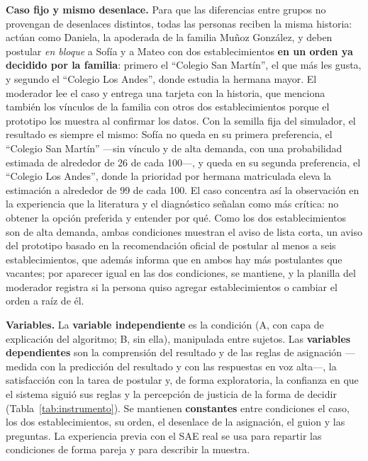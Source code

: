\textbf{Caso fijo y mismo desenlace.} Para que las diferencias entre grupos no provengan de desenlaces distintos, todas las personas reciben la misma historia: actúan como Daniela, la apoderada de la familia Muñoz González, y deben postular \emph{en bloque} a Sofía y a Mateo con dos establecimientos \textbf{en un orden ya decidido por la familia}: primero el ``Colegio San Martín'', el que más les gusta, y segundo el ``Colegio Los Andes'', donde estudia la hermana mayor. El moderador lee el caso y entrega una tarjeta con la historia, que menciona también los vínculos de la familia con otros dos establecimientos porque el prototipo los muestra al confirmar los datos. Con la semilla fija del simulador, el resultado es siempre el mismo: Sofía no queda en su primera preferencia, el ``Colegio San Martín'' ---sin vínculo y de alta demanda, con una probabilidad estimada de alrededor de 26 de cada 100---, y queda en su segunda preferencia, el ``Colegio Los Andes'', donde la prioridad por hermana matriculada eleva la estimación a alrededor de 99 de cada 100. El caso concentra así la observación en la experiencia que la literatura y el diagnóstico señalan como más crítica: no obtener la opción preferida y entender por qué. Como los dos establecimientos son de alta demanda, ambas condiciones muestran el aviso de lista corta, un aviso del prototipo basado en la recomendación oficial de postular al menos a seis establecimientos, que además informa que en ambos hay más postulantes que vacantes; por aparecer igual en las dos condiciones, se mantiene, y la planilla del moderador registra si la persona quiso agregar establecimientos o cambiar el orden a raíz de él.

\textbf{Variables.} La \textbf{variable independiente} es la condición (A, con capa de explicación del algoritmo; B, sin ella), manipulada entre sujetos. Las \textbf{variables dependientes} son la comprensión del resultado y de las reglas de asignación ---medida con la predicción del resultado y con las respuestas en voz alta---, la satisfacción con la tarea de postular y, de forma exploratoria, la confianza en que el sistema siguió sus reglas y la percepción de justicia de la forma de decidir (Tabla~\ref{tab:instrumento}). Se mantienen \textbf{constantes} entre condiciones el caso, los dos establecimientos, su orden, el desenlace de la asignación, el guion y las preguntas. La experiencia previa con el SAE real se usa para repartir las condiciones de forma pareja y para describir la muestra.

